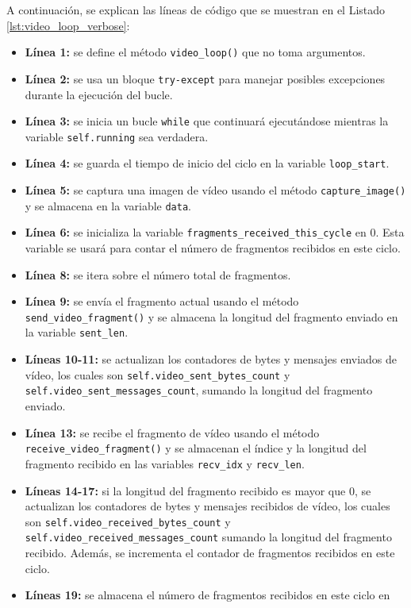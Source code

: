 A continuación, se explican las líneas de código que se muestran en el Listado \ref{lst:video_loop_verbose}:
\begin{itemize}
    \item \textbf{Línea 1:} se define el método \texttt{video\_loop()} que no toma argumentos.
    \item \textbf{Línea 2:} se usa un bloque \texttt{try-except} para manejar posibles excepciones durante la ejecución del bucle.
    \item \textbf{Línea 3:} se inicia un bucle \texttt{while} que continuará ejecutándose mientras la variable \texttt{self.running} sea verdadera.
    \item \textbf{Línea 4:} se guarda el tiempo de inicio del ciclo en la variable \texttt{loop\_start}.
    \item \textbf{Línea 5:} se captura una imagen de vídeo usando el método \texttt{capture\_image()} y se almacena en la variable \texttt{data}.
    \item \textbf{Línea 6:} se inicializa la variable \texttt{fragments\_received\_this\_cycle} en 0. Esta variable se usará para contar el número de fragmentos recibidos en este ciclo.
    \item \textbf{Línea 8:} se itera sobre el número total de fragmentos.
    \item \textbf{Línea 9:} se envía el fragmento actual usando el método \texttt{send\_video\_fragment()} y se almacena la longitud del fragmento enviado en la variable \texttt{sent\_len}.
    \item \textbf{Líneas 10-11:} se actualizan los contadores de bytes y mensajes enviados de vídeo, los cuales son \texttt{self.video\_sent\_bytes\_count} y \texttt{self.video\_sent\_messages\_count}, sumando la longitud del fragmento enviado.
    \item \textbf{Línea 13:} se recibe el fragmento de vídeo usando el método \texttt{receive\_video\_fragment()} y se almacenan el índice y la longitud del fragmento recibido en las variables \texttt{recv\_idx} y \texttt{recv\_len}.
    \item \textbf{Líneas 14-17:} si la longitud del fragmento recibido es mayor que 0, se actualizan los contadores de bytes y mensajes recibidos de vídeo, los cuales son \texttt{self.video\_received\_bytes\_count} y \texttt{self.video\_received\_messages\_count} sumando la longitud del fragmento recibido. Además, se incrementa el contador de fragmentos recibidos en este ciclo.
    \item \textbf{Líneas 19:} se almacena el número de fragmentos recibidos en este ciclo en \\

\end{itemize}
